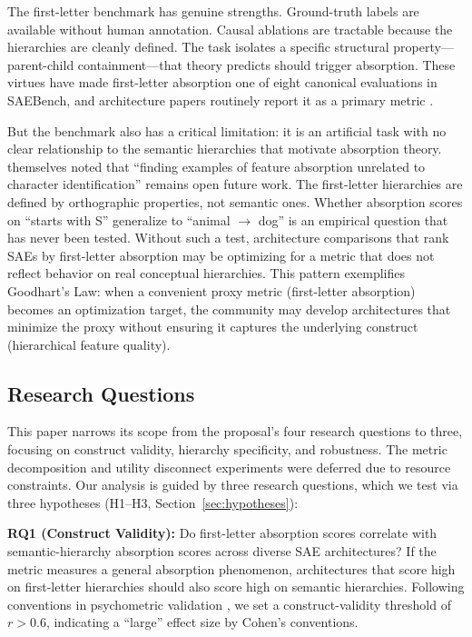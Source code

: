 \documentclass{article}
\begin{document}
The first-letter benchmark has genuine strengths. Ground-truth labels are available without human annotation. Causal ablations are tractable because the hierarchies are cleanly defined. The task isolates a specific structural property---parent-child containment---that theory predicts should trigger absorption. These virtues have made first-letter absorption one of eight canonical evaluations in SAEBench, and architecture papers routinely report it as a primary metric \citep{bussmann2025matryoshka,rajamanoharan2024jumprelu}.

But the benchmark also has a critical limitation: it is an artificial task with no clear relationship to the semantic hierarchies that motivate absorption theory. \citet{chanin2024feature} themselves noted that ``finding examples of feature absorption unrelated to character identification'' remains open future work. The first-letter hierarchies are defined by orthographic properties, not semantic ones. Whether absorption scores on ``starts with S'' generalize to ``animal $\to$ dog'' is an empirical question that has never been tested. Without such a test, architecture comparisons that rank SAEs by first-letter absorption may be optimizing for a metric that does not reflect behavior on real conceptual hierarchies. This pattern exemplifies Goodhart's Law: when a convenient proxy metric (first-letter absorption) becomes an optimization target, the community may develop architectures that minimize the proxy without ensuring it captures the underlying construct (hierarchical feature quality).

\subsection{Research Questions}

This paper narrows its scope from the proposal's four research questions to three, focusing on construct validity, hierarchy specificity, and robustness. The metric decomposition and utility disconnect experiments were deferred due to resource constraints. Our analysis is guided by three research questions, which we test via three hypotheses (H1--H3, Section~\ref{sec:hypotheses}):

\textbf{RQ1 (Construct Validity):} Do first-letter absorption scores correlate with semantic-hierarchy absorption scores across diverse SAE architectures? If the metric measures a general absorption phenomenon, architectures that score high on first-letter hierarchies should also score high on semantic hierarchies. Following conventions in psychometric validation \citep{crocker1986introduction}, we set a construct-validity threshold of $r > 0.6$, indicating a ``large'' effect size by Cohen's conventions.
\end{document}
